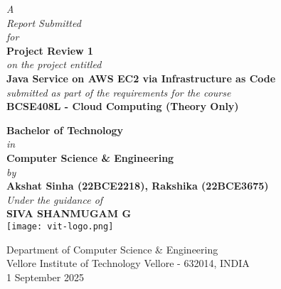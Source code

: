 \documentclass[12pt]{article}
\begin{document}
\begin{titlepage}
\thispagestyle{empty}

\begin{minipage}[c][\textheight][s]{\textwidth}
\centering

{\itshape A}\\[6pt]
{\itshape Report Submitted}\\[6pt]
{\itshape for}\\[10pt]
{\Large\bfseries Project Review 1}\\[8pt]
{\itshape on the project entitled}\\[10pt]
{\LARGE\bfseries Java Service on AWS EC2 via Infrastructure as Code}\\[10pt]

{\itshape submitted as part of the requirements for the course}\\[6pt]
{\Large\bfseries BCSE408L - Cloud Computing (Theory Only)}\\[6pt]


{\Large\bfseries Bachelor of Technology}\\[6pt]
{\itshape in}\\[4pt]
{\Large\bfseries Computer Science \& Engineering}\\[10pt]

{\itshape by}\\[6pt]
{\large\bfseries Akshat Sinha (22BCE2218), Rakshika (22BCE3675)}\\[10pt]

{\itshape Under the guidance of}\\[6pt]
{\large\bfseries SIVA SHANMUGAM G}\\[12pt]

\texttt{[image: vit-logo.png]}


{\large Department of Computer Science \& Engineering}\\
{\large Vellore Institute of Technology Vellore - 632014, INDIA}\\[8pt]
{\large 1 September 2025}

\end{minipage}
\end{titlepage}

\clearpage
{}\setcounter{page}{1}
\end{document}
